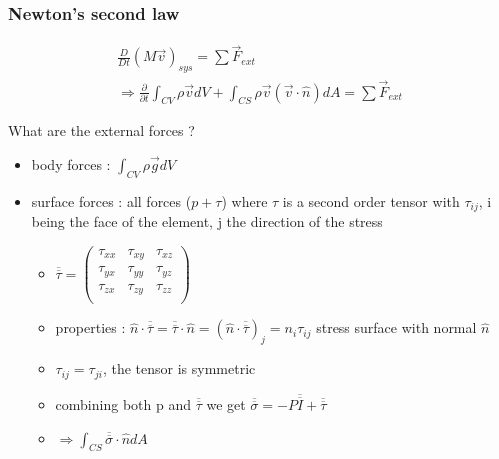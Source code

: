 \documentclass[../main.tex]{subfiles}
\begin{document}
\subsubsection{Newton's second law}
\begin{equation}
    \begin{gathered}
        \frac{D}{Dt}(M\Vec{v})_{sys} = \sum \Vec{F}_{ext}\\
        \Rightarrow \frac{\partial}{\partial t}\int_{CV}\rho \Vec{v}dV + \int_{CS} \rho \Vec{v}(\Vec{v}\cdot \hat{n})dA = \sum \Vec{F}_{ext}
    \end{gathered}
\end{equation}

What are the external forces ?\\
\begin{itemize}
    \item body forces : $\int_{CV} \rho \Vec{g}dV$\\
    \item surface forces : all forces ($p+\tau$) where $\tau$ is a second order tensor with $\tau_{ij}$, i being the face of the element, j the direction of the stress \begin{itemize}
        \item $\overline{\overline{\tau}} = \begin{pmatrix}
        \tau_{xx} & \tau_{xy} & \tau_{xz}\\
        \tau_{yx} & \tau_{yy} & \tau_{yz}\\
        \tau_{zx} & \tau_{zy} & \tau_{zz}\\
        \end{pmatrix}$
        \item properties : $\hat{n}\cdot \overline{\overline{\tau}} = \overline{\overline{\tau}}\cdot \hat{n} = (\hat{n}\cdot \overline{\overline{\tau}})_j = n_i \tau_{ij}$ stress surface with normal $\hat{n}$\\
        \item $\tau_{ij} = \tau_{ji}$, the tensor is symmetric\\
        \item combining both p and $\overline{\overline{\tau}}$ we get $\overline{\overline{\sigma}} = -P \overline{\overline{I}}+\overline{\overline{\tau}}$\\
        \item $\Rightarrow \int_{CS} \overline{\overline{\sigma}}\cdot \hat{n}dA$
    \end{itemize}
\end{itemize}
\end{document}
